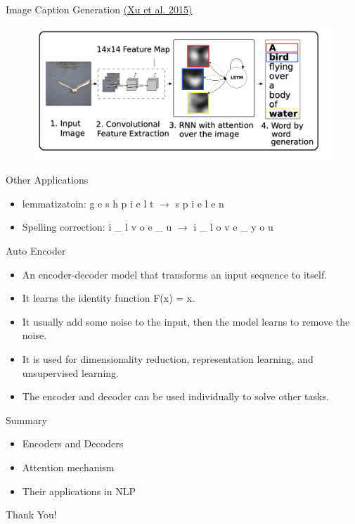 \begin{frame}{Image Caption Generation \hyperref[http://proceedings.mlr.press/v37/xuc15.html]{\textcolor{myblue}{\large{(Xu et al. 2015)}}}}
    \begin{figure}
        \includegraphics[scale=0.3]{./figure/image_captioning.png}
    \end{figure}
\end{frame}

\begin{frame}{Other Applications}
\begin{itemize}
    \item lemmatizatoin: g e s h p i e l t $\longrightarrow$  s p i e l e n 
    \item Spelling correction: i \_ l v o e \_ u  $\longrightarrow$ i \_ l o v e \_ y o u
\end{itemize}    
\end{frame}

\begin{frame}{Auto Encoder}
\begin{itemize}
    \item An encoder-decoder model that transforms an input sequence to itself.
    \item It learns the identity function F(x) = x.
    \item It usually add some noise to the input, then the model learns to remove the noise.
    \item It is used for dimensionality reduction, representation learning, and unsupervised learning.
    \item The encoder and decoder can be used individually to solve other tasks.
\end{itemize}
    
\end{frame}

\begin{frame}{Summary}
    \begin{itemize}
        \item Encoders and Decoders
        \item Attention mechanism
        \item Their applications in NLP
    \end{itemize}
\end{frame}
\begin{frame}[c]
\begin{center}
\LARGE{Thank You!}
\end{center}
\end{frame}

